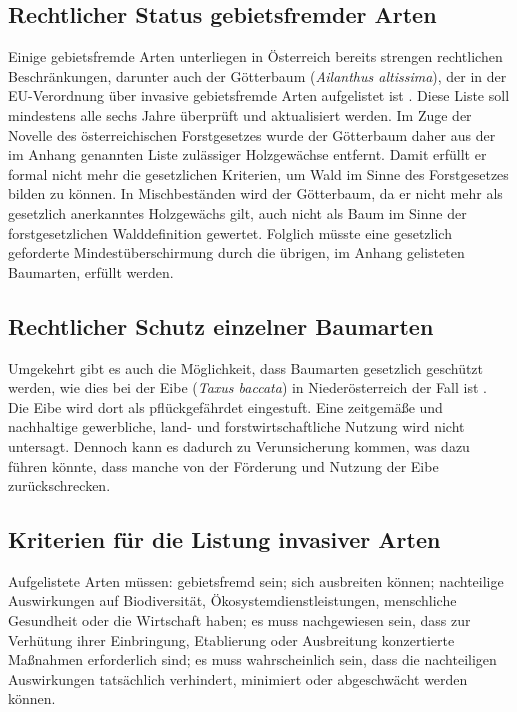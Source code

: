\documentclass[twocolumn]{scrartcl}
\begin{document}
\subsection{Rechtlicher Status gebietsfremder Arten}%

Einige gebietsfremde Arten unterliegen in Österreich bereits strengen
rechtlichen Beschränkungen, darunter auch der Götterbaum
(\emph{Ailanthus altissima}), der in der EU-Verordnung über invasive
gebietsfremde Arten aufgelistet ist
\citep{eu2019verordnungListeInvasiverArten,eu2014verordnungInvasiverArten}. Diese
Liste soll mindestens alle sechs Jahre überprüft und aktualisiert
werden. Im Zuge der Novelle des österreichischen Forstgesetzes wurde
der Götterbaum daher aus der im Anhang genannten Liste zulässiger
Holzgewächse entfernt. Damit erfüllt er formal nicht mehr die
gesetzlichen Kriterien, um Wald im Sinne des Forstgesetzes bilden zu
können. In Mischbeständen wird der Götterbaum, da er nicht mehr als
gesetzlich anerkanntes Holzgewächs gilt, auch nicht als Baum im Sinne
der forstgesetzlichen Walddefinition gewertet. Folglich müsste eine
gesetzlich geforderte Mindestüberschirmung durch die übrigen, im
Anhang gelisteten Baumarten, erfüllt werden.

\subsection{Rechtlicher Schutz einzelner Baumarten}

Umgekehrt gibt es auch die Möglichkeit, dass Baumarten gesetzlich
geschützt werden, wie dies bei der Eibe (\emph{Taxus baccata}) in
Niederösterreich der Fall ist
\citep{niederoesterreich2000Naturschutzgesetz,niederoesterreich2005artenschutzverordnung}. Die
Eibe wird dort als pflückgefährdet eingestuft. Eine zeitgemäße und
nachhaltige gewerbliche, land- und forstwirtschaftliche Nutzung wird
nicht untersagt. Dennoch kann es dadurch zu Verunsicherung kommen, was
dazu führen könnte, dass manche von der Förderung und Nutzung der Eibe
zurückschrecken.

\subsection{Kriterien für die Listung invasiver Arten}

Aufgelistete Arten müssen: gebietsfremd sein; sich ausbreiten können;
nachteilige Auswirkungen auf Biodiversität, Ökosystemdienstleistungen,
menschliche Gesundheit oder die Wirtschaft haben; es muss nachgewiesen
sein, dass zur Verhütung ihrer Einbringung, Etablierung oder
Ausbreitung konzertierte Maßnahmen erforderlich sind; es muss
wahrscheinlich sein, dass die nachteiligen Auswirkungen tatsächlich
verhindert, minimiert oder abgeschwächt werden können.
\end{document}
